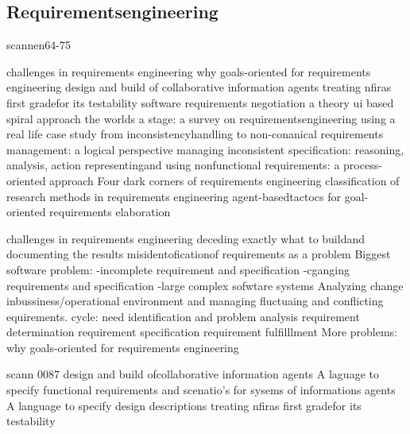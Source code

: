 \subsection{Requirementsengineering}


scannen64-75

challenges in requirements engineering
why goals-oriented for requirements engineering
design and build of collaborative information agents
treating nfiras first gradefor its testability
software requirements negotiation a theory ui based spiral approach
the worlds a stage: a survey on requirementsengineering using a real life case study
from inconsistencyhandling to non-conanical requirements management: a logical perspective
managing inconsistent specification: reasoning, analysis, action
representingand using nonfunctional requirements: a process-oriented approach
Four dark corners of requirements engineering
classification of research methods in requirements engineering
agent-basedtactocs for goal-oriented requirements elaboration


challenges in requirements engineering
deceding exactly what to buildand documenting the results
misidentoficationof requirements as a problem
Biggest software problem:
-incomplete requirement and specification
-cganging requirements and specification
-large complex sofwtare systems
Analyzing change inbussiness/operational environment and managing fluctuaing and conflicting equirements.
cycle:
need identification and problem analysis
requirement determination
requirement specification
requirement fulfilllment
More problems:
why goals-oriented for requirements engineering

scann 0087
design and build ofcollaborative information agents
A laguage to specify functional requirements and scenatio's for sysems of informations agents
A language to specify design descriptions
treating nfiras first gradefor its testability

